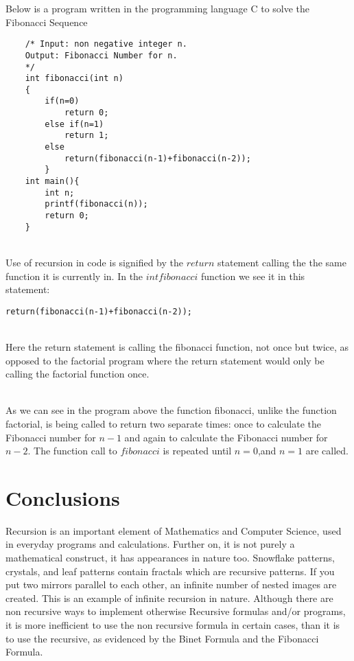 \documentclass{article}
\begin{document}
Below is a program written in the programming language C to solve the Fibonacci Sequence 
\\
\begin{lstlisting}
	/* Input: non negative integer n.
	Output: Fibonacci Number for n.
	*/
	int fibonacci(int n)
	{
		if(n=0)
			return 0;
		else if(n=1)
			return 1;
		else
			return(fibonacci(n-1)+fibonacci(n-2));
		}
	int main(){
		int n;
		printf(fibonacci(n));
		return 0;
	}

\end{lstlisting}
~\\
Use of recursion in code is signified by the $return$ statement calling the the same function it is currently in. In the $int fibonacci$ function we see it in this statement:
\\
\begin{lstlisting}
return(fibonacci(n-1)+fibonacci(n-2));
\end{lstlisting}
~\\
Here the return statement is calling the fibonacci function, not once but twice, as opposed to the factorial program where the return statement would only be calling the factorial function once.  
	
\begin{comment}
n=4
f(3)f(2)
f(
\end{comment}
~\\
As we can see in the program above the function fibonacci, unlike the function factorial, is being called to return two separate times: once to calculate the Fibonacci number for $n-1$ and again to calculate the Fibonacci number for $n-2$.  The function call to $fibonacci$ is repeated until $n=0$,and $n=1$ are called.  
\\
\section{Conclusions}
Recursion is an important element of Mathematics and Computer Science, used in everyday programs and calculations.  Further on, it is not purely a mathematical construct, it has appearances in nature too.  Snowflake patterns, crystals, and leaf patterns contain fractals which are recursive patterns. If you put two mirrors parallel to each other, an infinite number of nested images are created.  This is an example of infinite recursion in nature. Although there are non recursive ways to implement otherwise Recursive formulas and/or programs, it is more inefficient to use the non recursive formula in certain cases, than it is to use the recursive, as evidenced by the Binet Formula and the Fibonacci Formula.
\end{document}
